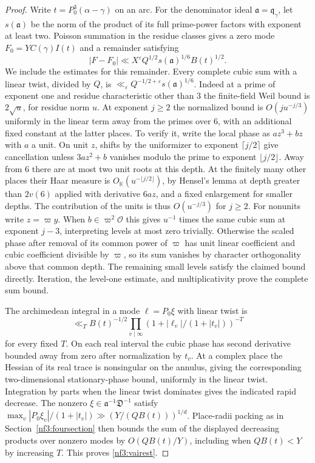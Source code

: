 \documentclass[11pt,letterpaper]{article}
\theoremstyle{definition}
\numberwithin{equation}{section}
\begin{document}
\begin{proof}
Write $t=P_0^3(\alpha-\gamma)$ on an arc. For the denominator ideal
$\mathfrak a=\mathfrak q_\gamma$, let $s(\mathfrak a)$ be the norm of
the product of its full prime-power factors with exponent at least two.
Poisson summation in the residue classes gives a zero mode
$F_0=Y C(\gamma)I(t)$ and a remainder satisfying
\begin{equation}\label{nf3:vairest}
 |F-F_0|\ll X^\varepsilon Q^{1/2}s(\mathfrak a)^{1/6} B(t)^{1/2}.
\end{equation}
We include the estimates for this remainder.
Every complete cubic sum with a linear twist, divided by $Q$, is
$\ll_\varepsilon Q^{-1/2+\varepsilon}s(\mathfrak a)^{1/6}$.
Indeed at a prime of exponent one and residue characteristic other
than $3$ the finite-field Weil bound is $2\sqrt u$, for residue norm
$u$. At exponent $j\ge2$ the normalized bound is
$O(j u^{-j/3})$ uniformly in the linear term away from the primes
over $6$, with an additional fixed constant at the latter places.
To verify it, write the local phase as $a z^3+bz$ with $a$ a unit.
On unit $z$, shifts by the uniformizer to exponent $\lceil j/2\rceil$
give cancellation unless $3az^2+b$ vanishes modulo the prime to
exponent $\lfloor j/2\rfloor$. Away from $6$ there are at most two
unit roots at this depth. At the finitely many other places their
Haar measure is $O_{\mathbb K}(u^{-\lfloor j/2\rfloor})$, by Hensel's
lemma at depth greater than $2v(6)$ applied with derivative $6az$,
and a fixed enlargement for smaller depths. The contribution of the
units is thus $O(u^{-j/3})$ for $j\ge2$. For nonunits write $z=\varpi y$.
When $b\in\varpi^2\mathcal O$ this gives $u^{-1}$ times the same cubic
sum at exponent $j-3$, interpreting levels at most zero trivially.
Otherwise the scaled phase after removal of its common power of
$\varpi$ has unit linear coefficient and cubic coefficient divisible
by $\varpi$, so its sum vanishes by character orthogonality above that common
depth. The remaining small levels satisfy the claimed bound directly.
Iteration, the level-one estimate, and multiplicativity prove the
complete sum bound.

The archimedean integral in a mode $\ell=P_0\xi$ with linear twist is
\[
 \ll_T B(t)^{-1/2}
        \prod_{v\mid\infty}(1+|\ell_v|/(1+|t_v|))^{-T}
\]
for every fixed $T$. On each real interval the cubic phase has
second derivative bounded away from zero after normalization by $t_v$.
At a complex place the Hessian of its real trace is nonsingular on the
annulus, giving the corresponding two-dimensional stationary-phase
bound, uniformly in the linear twist. Integration by parts when the
linear twist dominates gives the indicated rapid decrease.
The nonzero $\xi\in\mathfrak a^{-1}\mathfrak D^{-1}$ satisfy
$\max_v |P_0\xi_v|/(1+|t_v|)\gg(Y/(QB(t)))^{1/d}$.
Place-radii packing as in Section~\ref{nf3:foursection} then bounds
the sum of the displayed decreasing products over nonzero modes by
$O(QB(t)/Y)$, including when $QB(t)<Y$ by increasing $T$.
This proves \eqref{nf3:vairest}.


\end{proof}
\end{document}
